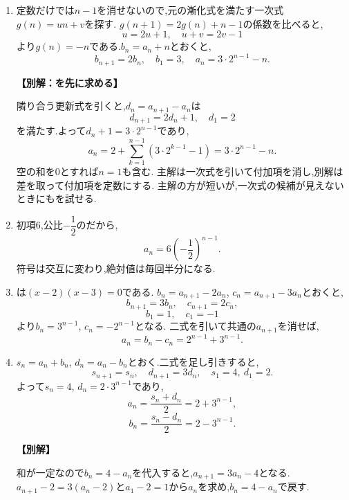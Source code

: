 \begin{enumerate}[label=\textbf{問\arabic*.},leftmargin=3.8em,format=\bookitemlink{practice-basic}{solution}{problem}]
          \item 定数だけでは$n-1$を消せないので,元の漸化式を満たす一次式$g(n)=un+v$を探す.
                  $g(n+1)=2g(n)+n-1$の係数を比べると,
                  \[
                    u=2u+1,\quad u+v=2v-1
                  \]
                  より$g(n)=-n$である.$b_n=a_n+n$とおくと,
                  \[
                    b_{n+1}=2b_n,\quad b_1=3,\quad a_n=3\cdot2^{n-1}-n.
                  \]
                  \par\smallskip\noindent\textbf{【別解：を先に求める】}\par
                  隣り合う更新式を引くと,$d_n=a_{n+1}-a_n$は
                  \[
                    d_{n+1}=2d_n+1,\quad d_1=2
                  \]
                  を満たす.よって$d_n+1=3\cdot2^{n-1}$であり,
                  \[
                    a_n=2+\sum_{k=1}^{n-1}(3\cdot2^{k-1}-1)
                       =3\cdot2^{n-1}-n.
                  \]
                  空の和を$0$とすれば$n=1$も含む.
                  主解は一次式を引いて付加項を消し,別解は差を取って付加項を定数にする.
                  主解の方が短いが,一次式の候補が見えないときにもを試せる.

          \item 初項$6$,公比$-\dfrac{1}{2}$のだから,
                  \[
                    a_n=6\left(-\frac12\right)^{n-1}.
                  \]
                  符号は交互に変わり,絶対値は毎回半分になる.

          \item {}は$(x-2)(x-3)=0$である.
                  $b_n=a_{n+1}-2a_n$, $c_n=a_{n+1}-3a_n$とおくと,
                  \[
                    b_{n+1}=3b_n,\quad c_{n+1}=2c_n,
                  \]
                  \[
                    b_1=1,\quad c_1=-1
                  \]
                  より$b_n=3^{n-1}$, $c_n=-2^{n-1}$となる.
                  二式を引いて共通の$a_{n+1}$を消せば,
                  \[
                    a_n=b_n-c_n=2^{n-1}+3^{n-1}.
                  \]

          \item $s_n=a_n+b_n$, $d_n=a_n-b_n$とおく.二式を足し引きすると,
                  \[
                    s_{n+1}=s_n,\quad d_{n+1}=3d_n,\quad s_1=4,\ d_1=2.
                  \]
                  よって$s_n=4$, $d_n=2\cdot3^{n-1}$であり,
                  \[
                    a_n=\frac{s_n+d_n}{2}=2+3^{n-1},
                  \]
                  \[
                    b_n=\frac{s_n-d_n}{2}=2-3^{n-1}.
                  \]
                  \par\smallskip\noindent\textbf{【別解】}\par
                  和が一定なので$b_n=4-a_n$を代入すると,$a_{n+1}=3a_n-4$となる.
                  $a_{n+1}-2=3(a_n-2)$と$a_1-2=1$から$a_n$を求め,$b_n=4-a_n$で戻す.


\end{enumerate}
